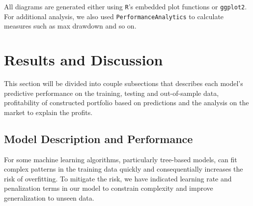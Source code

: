 \documentclass[oneside, 12pt]{article}
\newcommand*{\1}{\text{\scalebox{1.1}{\usefont{U}{bbold}{m}{n}1}}}
\begin{document}
All diagrams are generated either using \texttt{R}'s embedded plot functions or \texttt{ggplot2}. For additional analysis, we also used \texttt{PerformanceAnalytics} to calculate measures such as max drawdown and so on. 

\newpage

\section{Results and Discussion}
This section will be divided into couple subsections that describes each model's predictive performance on the training, testing and out-of-sample data, profitability of constructed portfolio based on predictions and the analysis on the market to explain the profits. 

\subsection{Model Description and Performance}
For some machine learning algorithms, particularly tree-based models, can fit complex patterns in the training data quickly and consequentially increases the risk of overfitting. To mitigate the risk, we have indicated learning rate and penalization terms in our model to constrain complexity and improve generalization to unseen data. 
\end{document}
